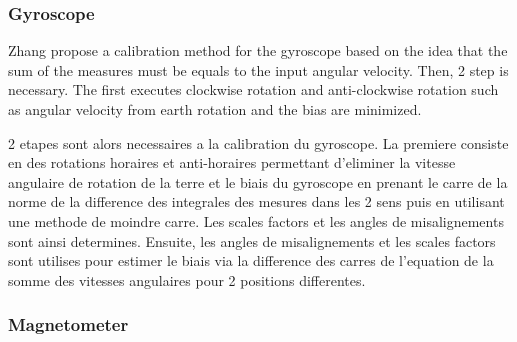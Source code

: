 \subsubsection{Gyroscope}

%


Zhang  propose a calibration method for the gyroscope based on the idea that the sum of the measures must be equals to the input angular velocity.  Then, 2 step is necessary. The first executes clockwise rotation and anti-clockwise rotation such as angular velocity from earth rotation and the bias are minimized. 

2 etapes sont alors necessaires a la calibration du gyroscope. La premiere consiste en des rotations horaires et anti-horaires permettant d'eliminer la vitesse angulaire de rotation de la terre et le biais du gyroscope en prenant le carre de la norme de la difference des integrales des mesures dans les 2 sens puis en utilisant une methode de moindre carre. Les scales factors et les angles de misalignements sont ainsi determines. Ensuite, les angles de misalignements et les scales factors sont utilises pour estimer le biais via la difference des carres de l'equation de la somme des vitesses angulaires pour 2 positions differentes.

\subsubsection{Magnetometer}


%
%

